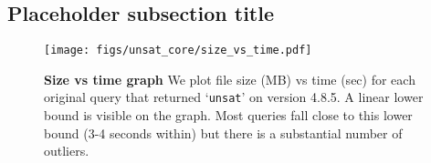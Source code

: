 \documentclass{article}
\newcommand{\unsat}{\texttt{unsat}\xspace}
\begin{document}
\subsection{Placeholder subsection title}
\begin{figure}[H]
    \begin{minipage}[c]{\textwidth}
      \texttt{[image: figs/unsat\_core/size\_vs\_time.pdf]}
      \vspace{-0.5cm}
      \caption{\textbf{Size vs time graph} We plot file size (MB) vs time (sec) for each original query that returned `\unsat' on version 4.8.5. A linear lower bound is visible on the graph. Most queries fall close to this lower bound (3-4 seconds within) but there is a substantial number of outliers.}
      \label{fig:dkomodo_pert_ext}
      \vspace{0.5cm}
    \end{minipage}
\end{figure}

\clearpage
\end{document}

